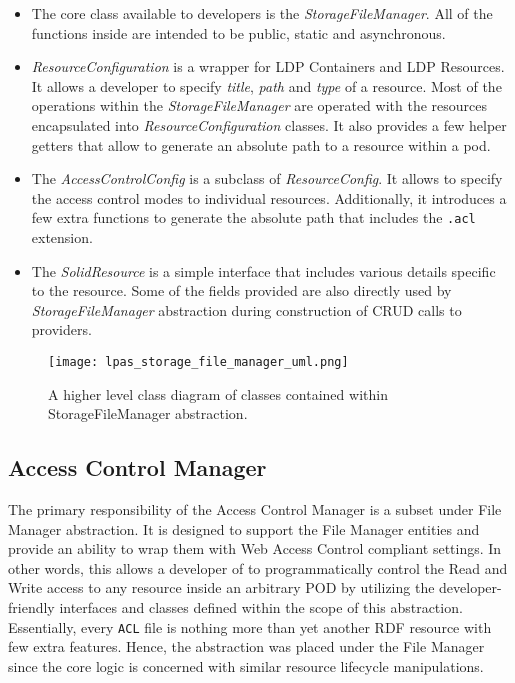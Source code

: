 \begin{itemize}
	\item The core class available to \lpa{} developers is the \textit{StorageFileManager}. All of the functions inside are intended to be public, static and asynchronous. 
	\item \textit{ResourceConfiguration} is a wrapper for LDP Containers and LDP Resources. It allows a developer to specify \textit{title}, \textit{path} and \textit{type} of a resource. Most of the operations within the \textit{StorageFileManager} are operated with the resources encapsulated into \textit{ResourceConfiguration} classes. It also provides a few helper getters that allow to generate an absolute path to a resource within a pod. 
	\item The \textit{AccessControlConfig} is a subclass of \textit{ResourceConfig}. It allows to specify the access control modes to individual resources. Additionally, it introduces a few extra functions to generate the absolute path that includes the \texttt{.acl} extension.   
	\item The \textit{SolidResource} is a simple interface that includes various details specific to the resource. Some of the fields provided are also directly used by \textit{StorageFileManager} abstraction during construction of CRUD calls to \solid{} providers.
\end{itemize}


\begin{figure}[h]
\centering
\texttt{[image: lpas\_storage\_file\_manager\_uml.png]}
\caption{A higher level class diagram of classes contained within StorageFileManager abstraction.}
\label{fig:lps_file_manager_class_uml}
\end{figure}


\subsection{Access Control Manager}

The primary responsibility of the Access Control Manager is a subset under File Manager abstraction. It is designed to support the File Manager entities and provide an ability to wrap them with Web Access Control compliant settings. In other words, this allows a developer of \lpa{} to programmatically control the Read and Write access to any resource inside an arbitrary \solid{} POD by utilizing the developer-friendly interfaces and classes defined within the scope of this abstraction. Essentially, every \texttt{ACL} file is nothing more than yet another RDF resource with few extra features. Hence, the abstraction was placed under the File Manager since the core logic is concerned with similar resource lifecycle manipulations.

